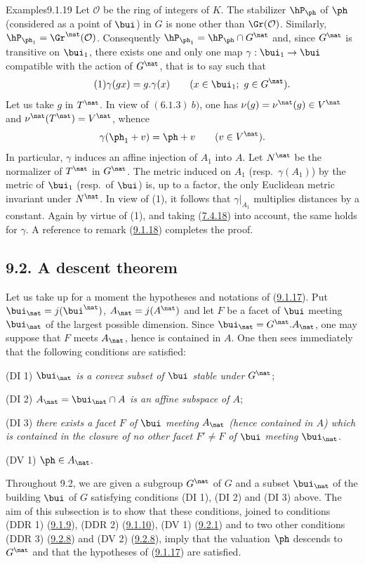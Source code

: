 \documentclass[12pt,a4paper,oneside,english]{smfart}
\makeatletter
\newcommand{\btanchor}[1]{\leavevmode\Hy@raisedlink{\hypertarget{bt:#1}{}}}
\newcommand{\btref}[1]{\hyperlink{bt:#1}{#1}}
\newcommand{\btsecB}[2]{%
  \par\needspace{4\baselineskip}\phantomsection
  \subsection*{#2}%
  \ifx\relax#1\relax\else\btanchor{#1}\fi}
\theoremstyle{definition}
\theoremstyle{bt}
\makeatother
\begin{document}
\begin{stmtup}{Examples}{9.1.19}
Let $\mathcal{O}$ be the ring of integers of $K$. The stabilizer $\hP_\ph$ of $\ph$
(considered as a point of $\bui$) in $G$ is none other than $\Gr(\mathcal{O})$.
Similarly, $\hP_{\ph_1}=\Gr^\nat(\mathcal{O})$. Consequently
$\hP_{\ph_1}=\hP_\ph\cap G^\nat$ and, since $G^\nat$ is transitive on $\bui_1$, there
exists one and only one map $\gamma:\bui_1\to\bui$ compatible with the action of
$G^\nat$, that is to say such that
\begin{equation}\tag{1}
\gamma(gx)=g.\gamma(x)\qquad(x\in\bui_1;\ g\in G^\nat).
\end{equation}
Let us take $g$ in $T^\nat$. In view of $(6.1.3)\ b)$, one has
$\nu(g)=\nu^\nat(g)\in V^\nat$ and $\nu^\nat(T^\nat)=V^\nat$, whence
\[
\gamma(\ph_1+v)=\ph+v\qquad(v\in V^\nat).
\]
In particular, $\gamma$ induces an affine injection of $A_1$ into $A$. Let $N^\nat$ be
the normalizer of $T^\nat$ in $G^\nat$. The metric induced on $A_1$
(resp.\ $\gamma(A_1)$) by the metric of $\bui_1$ (resp.\ of $\bui$) is, up to a factor,
the only Euclidean metric invariant under $N^\nat$. In view of (1), it follows that
$\gamma|_{A_1}$ multiplies distances by a constant. Again by virtue of (1), and taking
(\btref{7.4.18}) into account, the same holds for $\gamma$. A reference to remark (\btref{9.1.18})
completes the proof.
\end{stmtup}

\medskip

\btsecB{9.2}{9.2. A descent theorem}

\btanchor{9.2.1}
Let us take up for a moment the hypotheses and notations of (\btref{9.1.17}). Put
$\bui_\nat=j(\bui^\nat)$, $A_\nat=j(A^\nat)$ and let $F$ be a facet of $\bui$ meeting
$\bui_\nat$ of the largest possible dimension. Since $\bui_\nat=G^\nat.A_\nat$, one may
suppose that $F$ meets $A_\nat$, hence is contained in $A$. One then sees immediately
that the following conditions are satisfied:

\medskip
\noindent
(DI 1) \emph{$\bui_\nat$ is a convex subset of $\bui$ stable under $G^\nat$};

\noindent
(DI 2) \emph{$A_\nat=\bui_\nat\cap A$ is an affine subspace of $A$};

\noindent
(DI 3) \emph{there exists a facet $F$ of $\bui$ meeting $A_\nat$ (hence contained in
$A$) which is contained in the closure of no other facet $F'\neq F$ of $\bui$ meeting
$\bui_\nat$.}

\medskip
\noindent
(DV 1) \emph{$\ph\in A_\nat$.}

\btanchor{9.2.2}
Throughout 9.2, we are given a subgroup $G^\nat$ of $G$ and a subset $\bui_\nat$ of the
building $\bui$ of $G$ satisfying conditions (DI 1), (DI 2) and (DI 3) above. The aim of
this subsection is to show that these conditions, joined to conditions (DDR 1) (\btref{9.1.9}),
(DDR 2) (\btref{9.1.10}), (DV 1) (\btref{9.2.1}) and to two other conditions (DDR 3) (\btref{9.2.8}) and
(DV 2) (\btref{9.2.8}), imply that the valuation $\ph$ descends to $G^\nat$ and that the
hypotheses of (\btref{9.1.17}) are satisfied.
\end{document}
